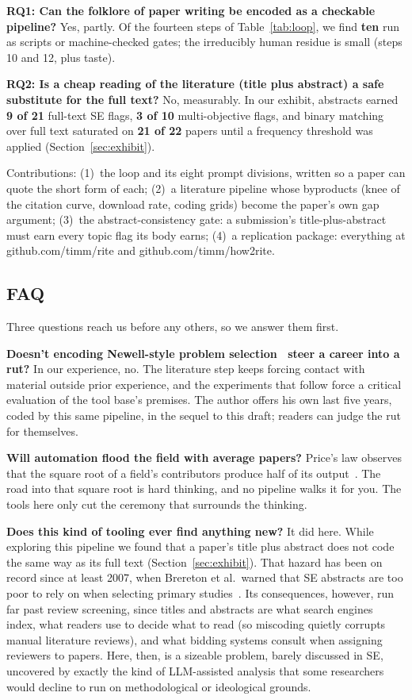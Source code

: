 \textbf{RQ1: Can the folklore of paper writing be encoded as a
checkable pipeline?}
Yes, partly.
Of the fourteen steps of Table~\ref{tab:loop}, we find \textbf{ten}
run as scripts or machine-checked gates; the irreducibly human residue
is small (steps 10 and 12, plus taste).

\textbf{RQ2: Is a cheap reading of the literature (title plus
abstract) a safe substitute for the full text?}
No, measurably.
In our exhibit, abstracts earned \textbf{9 of 21} full-text SE flags,
\textbf{3 of 10} multi-objective flags, and binary matching over full
text saturated on \textbf{21 of 22} papers until a frequency threshold
was applied (Section~\ref{sec:exhibit}).

Contributions: (1)~the loop and its eight prompt divisions, written so
a paper can quote the short form of each; (2)~a literature pipeline
whose byproducts (knee of the citation curve, download rate, coding
grids) become the paper's own gap argument; (3)~the
abstract-consistency gate: a submission's title-plus-abstract must
earn every topic flag its body earns; (4)~a replication package:
everything at github.com/timm/rite and github.com/timm/how2rite.

\subsection{FAQ}\label{sec:faq}

Three questions reach us before any others, so we answer them first.

\textbf{Doesn't encoding Newell-style problem
selection~\cite{newell76,newell91} steer a career into a rut?}
In our experience, no.
The literature step keeps forcing contact with material outside prior
experience, and the experiments that follow force a critical
evaluation of the tool base's premises.
The author offers his own last five years, coded by this same
pipeline, in the sequel to this draft; readers can judge the rut for
themselves.

\textbf{Will automation flood the field with average papers?}
Price's law observes that the square root of a field's contributors
produce half of its output~\cite{price63}.
The road into that square root is hard thinking, and no pipeline walks
it for you.
The tools here only cut the ceremony that surrounds the thinking.

\textbf{Does this kind of tooling ever find anything new?}
It did here.
While exploring this pipeline we found that a paper's title plus
abstract does not code the same way as its full text
(Section~\ref{sec:exhibit}).
That hazard has been on record since at least 2007, when Brereton et
al.\ warned that SE abstracts are too poor to rely on when selecting
primary studies~\cite{brereton07}.
Its consequences, however, run far past review screening, since titles
and abstracts are what search engines index, what readers use to
decide what to read (so miscoding quietly corrupts manual literature
reviews), and what bidding systems consult when assigning reviewers to
papers.
Here, then, is a sizeable problem, barely discussed in SE, uncovered
by exactly the kind of LLM-assisted analysis that some researchers
would decline to run on methodological or ideological grounds.


